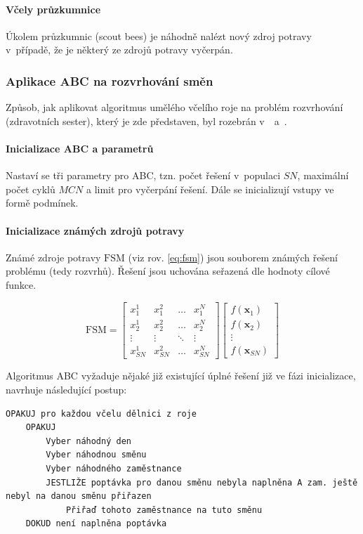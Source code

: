 \documentclass[twoside]{ctuthesis}
\begin{document}
\begin{enumerate}[label=\textbf{O\arabic*.}]
\paragraph{Včely průzkumnice}
Úkolem průzkumnic (scout bees) je náhodně nalézt nový zdroj potravy v~případě, že je některý ze zdrojů potravy vyčerpán.

\subsubsection{Aplikace ABC na rozvrhování směn}
Způsob, jak aplikovat algoritmus umělého včelího roje na problém roz\-vr\-ho\-vá\-ní (zdravotních sester), který je zde představen, byl rozebrán v~\cite{buyukozkan2014applicability}~a~\cite{awadallah2015hybrid}.

\paragraph{Inicializace ABC a parametrů}
Nastaví se tři parametry pro ABC, tzn. počet řešení v~populaci $SN$, maximální počet cyklů $MCN$ a limit pro vyčerpání řešení. Dále se inicializují vstupy ve formě podmínek.

\paragraph{Inicializace známých zdrojů potravy}
Známé zdroje potravy $\boldsymbol{\mathrm{FSM}}$ (viz rov. \ref{eq:fsm}) jsou souborem známých řešení problému (tedy rozvrhů). Řešení jsou uchována seřazená dle hodnoty cílové funkce.

\begin{equation}
	\label{eq:fsm}
	\boldsymbol{\mathrm{FSM}} =
	\begin{bmatrix}
			x_1^1 & x_1^2 & \ldots & x_1^{N} \\
			x_2^1 & x_2^2 & \ldots & x_2^{N} \\
			\vdots & \vdots & \ddots & \vdots \\
			x_{SN}^1 & x_{SN}^2 & \ldots & x_{SN}^{N}
	\end{bmatrix}
	\begin{bmatrix}
			f(\boldsymbol{x}_1)\\
			f(\boldsymbol{x}_2)\\
			\vdots \\
			f(\boldsymbol{x}_{SN})
	\end{bmatrix}
\end{equation}

Algoritmus ABC vyžaduje nějaké již existující úplné řešení již ve fázi inicializace, \cite{buyukozkan2014applicability} navrhuje následující postup:
\begin{lstlisting}[caption={Pseudokód pro ABC}]
OPAKUJ pro každou včelu dělnici z roje
	OPAKUJ
		Vyber náhodný den
		Vyber náhodnou směnu
		Vyber náhodného zaměstnance
		JESTLIŽE poptávka pro danou směnu nebyla naplněna A zam. ještě nebyl na danou směnu přiřazen
			Přiřaď tohoto zaměstnance na tuto směnu
	DOKUD není naplněna poptávka
\end{lstlisting}


\end{enumerate}
\end{document}
